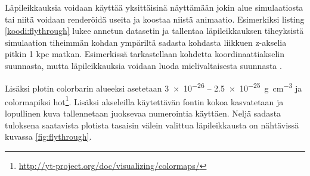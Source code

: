 \documentclass[12pt,a4paper]{article}
\begin{document}
Läpileikkauksia voidaan käyttää yksittäisinä näyttämään jokin alue simulaatiosta tai niitä voidaan renderöidä useita ja koostaa niistä animaatio. Esimerkiksi listing \ref{koodi:flythrough} lukee annetun datasetin ja tallentaa läpileikkauksen tiheyksistä simulaation tiheimmän kohdan ympäriltä sadasta kohdasta liikkuen z-akselia pitkin 1 kpc matkan. Esimerkissä tarkastellaan kohdetta koordinaattiakselin suunnasta, mutta läpileikkauksia voidaan luoda mielivaltaisesta suunnasta \cite{sliceproj}.

Lisäksi plotin colorbarin alueeksi asetetaan \SI{3e-26}{} -- \SI{2.5e-25}{\gram\per\cubic\centi\metre} ja colormapiksi hot\footnote{\url{http://yt-project.org/doc/visualizing/colormaps/}}. Lisäksi akseleilla käytettävän fontin kokoa kasvatetaan ja lopullinen kuva tallennetaan juoksevaa numerointia käyttäen. Neljä sadasta tuloksena saatavista plotista tasaisin välein valittua läpileikkausta on nähtävissä kuvassa \ref{fig:flythrough}.

\begin{minipage}{\linewidth}

\end{minipage}
\end{document}

